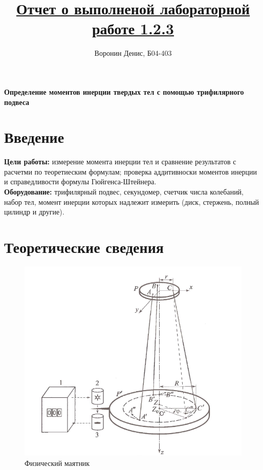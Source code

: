 \documentclass[a4paper]{article}
\title{\underline{Отчет о выполненой лабораторной работе 1.2.3}}
\author{Воронин Денис, Б04-403}
\begin{document}
\maketitle

\begin{center}
\textbf{\Large Определение моментов инерции твердых тел с помощью трифилярного подвеса}
\end{center}

\section{Введение}
\textbf{Цели работы:} измерение момента инерции тел и сравнение результатов с расчетми по теоретиеским формулам; проверка аддитивноски моментов инерции и справедливости формулы Гюйгенса-Штейнера.\\
\textbf{Оборудование:} трифилярный подвес, секундомер, счетчик числа колебаний, набор тел, момент инерции которых надлежит измерить (диск, стержень, полный цилиндр и другие).

\section{Теоретические сведения}
	
\begin{figure}
    \includegraphics[width=0.95\linewidth]{pick1.PNG}
    \caption{Физический маятник}\label{risunok}
\end{figure}
\end{document}
